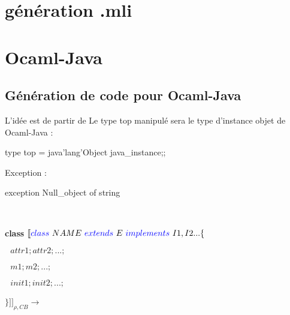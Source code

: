 \documentclass[a4paper, 11pt]{report}
\begin{document}
\section{génération .mli}
 







\newpage

\section{Ocaml-Java}


\subsection{Génération de code pour Ocaml-Java}
L'idée est de partir de 
Le type top manipulé sera le type d'instance objet de Ocaml-Java :
\begin{OCaml}
type top = java'lang'Object java_instance;;
\end{OCaml}

Exception :
\begin{OCaml}
exception Null_object of string
\end{OCaml}
\ 
\newline

\textbf{class}
\newline
\noindent
$[\![ {\color{blue}class}\ NAME\ 
 {\color{blue}extends}\  E \ 
 {\color{blue}implements}\  I1,I2... \{$

 $ \ \ \ attr1; attr2; ...;$

  $\ \ \ m1; m2; ...;$

  $\ \ \ init1; init2; ...;$

 $\} ]\!]_{\rho,CB}\longrightarrow$
\ 
\newline
\end{document}
